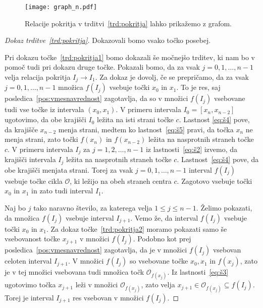 \documentclass[../TG_magistrsko_delo_sections.tex]{subfiles}
\begin{document}
\begin{figure}[h]
  \centering
  \texttt{[image: graph\_n.pdf]}
  \caption[Primer vektorske slike.]{Relacije pokritja v trditvi~\ref{trd:pokritja} lahko prikažemo z grafom.}
  \label{fig:nkotnik}
\end{figure}

\begin{proof}[Dokaz trditve~\ref{trd:pokritja}]
Dokazovali bomo vsako točko posebej. 

Pri dokazu točke~\ref{trd:pokritja1} bomo dokazali še močnejšo trditev, ki nam bo v pomoč tudi pri dokazu druge točke. Pokazali bomo, da za vsak $j = 0, 1, \dots, n-1$ velja relacija pokritja $I_j \to I_1$.  Za dokaz je dovolj, če se prepričamo, da za vsak $j=0, 1, \dots, n-1$ množica $f(I_j)$ vsebuje točki $x_0$ in $x_1$. To je res, saj posledica~\ref{pos:vmesnavrednost} zagotavlja, da so v množici $f(I_j)$ vsebovane tudi vse točke iz intervala $(x_0, x_1)$. V primeru intervala $I_0 = [x_n, x_{n-2}]$ ugotovimo, da obe krajišči $I_0$ ležita na isti strani točke $c$. Lastnost \ref{eq:š4} pove, da krajišče $x_{n-2}$ menja strani, medtem ko lastnost~\ref{eq:š5} pravi, da točka $x_n$ ne menja strani, zato točki $f(x_n)$ in $f(x_{n-2})$ ležita na nasprotnih straneh točke $c$. V primeru intervala $I_j$ za $j = 1, 2, \dots, n-1$ iz lastnosti~\ref{eq:š2} izvemo, da krajišči intervala $I_j$ ležita na nasprotnih straneh točke $c$. Lastnost~\ref{eq:š4} pove, da obe krajišči menjata strani. Torej za vsak $j=0, 1, \dots, n-1$ interval $f(I_j)$ vsebuje točke cikla $\mathcal{O}$, ki ležijo na obeh straneh centra $c$. Zagotovo vsebuje točki $x_0$ in $x_1$ in zato tudi interval $I_1$.

Naj bo $j$ tako naravno število, za katerega velja $1 \leq j \leq n-1$. Želimo pokazati, da množica $f(I_j)$ vsebuje interval $I_{j+1}$. Vemo že, da interval $f(I_j)$ vsebuje točki $x_0$ in $x_1$. Za dokaz točke~\ref{trd:pokritja2} moramo pokazati samo še vsebovanost točke $x_{j+1}$ v množici $f(I_j)$. Podobno kot prej posledica~\ref{pos:vmesnavrednost} zagotavlja, da je v množici $f(I_j)$ vsebovan celoten interval $I_{j+1}$. V množici $f(I_j)$ so vsebovane točke $x_0, x_1$ in $f(x_j)$, zato je v tej množici vsebovana tudi množica točk $\mathcal{O}_{f(x_j)}$. Iz lastnosti~\ref{eq:š3} ugotovimo točka $x_{j+1}$ leži v množici $\mathcal{O}_{f(x_j)}$, zato velja $x_{j+1} \in \mathcal{O}_{f(x_j)} \subseteq f(I_j)$. Torej je interval $I_{j+1}$ res vsebovan v množici $f(I_j)$.


\end{proof}
\end{document}

